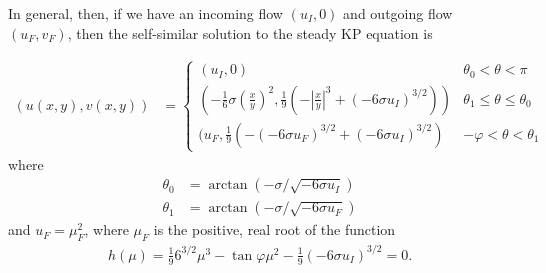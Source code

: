 \documentclass[12pt]{article}
\numberwithin{equation}{section}
\begin{document}
In general, then, if we have an incoming flow $(u_I,0)$ and outgoing flow $(u_F,v_F)$, then the self-similar solution to the steady KP equation is

\begin{align}
    (u(x,y),v(x,y)) &= \left\{
    \begin{array}{rl}
        \left(u_I,0\right) & \theta_0<\theta<\pi \\
        \left(-\frac{1}{6}\sigma\left(\frac{x}{y}\right)^2,\frac{1}{9}\left(-\left|\frac{x}{y}\right|^3+(-6\sigma u_I)^{3/2}\right)\right) & \theta_1 \leq \theta \leq \theta_0 \\
        (u_F,\frac{1}{9}(-(-6\sigma u_F)^{3/2}+(-6\sigma u_I)^{3/2}) & -\varphi <\theta<\theta_1
    \end{array}\right.
\end{align}
where 
\begin{subequations}
    \begin{align}
        \theta_0 &= \arctan(-\sigma/\sqrt{-6\sigma u_I}) \\
        \theta_1 &= \arctan(-\sigma/\sqrt{-6\sigma u_F})
    \end{align}
\end{subequations}
and $u_F = \mu_F^2$, where $\mu_F$ is the positive, real root of the function
\begin{align}
    h(\mu)=\frac{1}{9}6^{3/2}\mu^3 - \tan \varphi \mu^2 - \frac{1}{9}(-6\sigma u_I)^{3/2} = 0.
\end{align}
\end{document}
